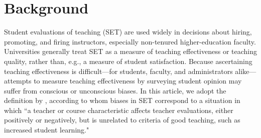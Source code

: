 \documentclass[12pt]{article}
\begin{document}
\begin{quotation}
\begin{abstract}

%

\end{abstract}

\newpage

\end{quotation}

\section{Background}
Student evaluations of teaching (SET) are used widely 
in decisions about hiring, promoting, and firing instructors, especially non-tenured 
higher-education faculty. 
Universities generally treat SET as a measure of teaching effectiveness or teaching quality, 
rather than, e.g., a measure of student satisfaction.
Because ascertaining teaching effectiveness is difficult---for students,
faculty, and administrators alike---attempts to measure teaching effectiveness by
surveying student opinion may suffer from conscious or unconscious biases. 
In this article, we adopt the definition by \citet[p.17]{Centra2000}, according to whom 
biases in SET correspond to a situation in which ``a teacher
or course characteristic affects teacher evaluations, either positively or
negatively, but is unrelated to criteria of good teaching, such as increased student learning." 
\end{document}
